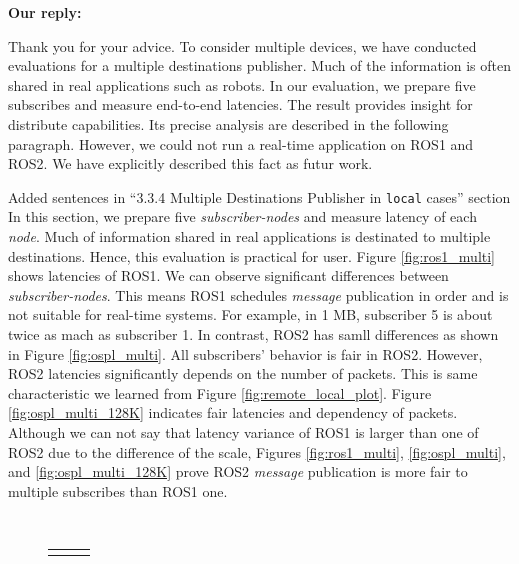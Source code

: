 \documentclass{article}
\begin{document}
\begin{enumerate}
  \begin{flushleft}
    \textbf{Our reply:}
  \end{flushleft}
  Thank you for your advice.
  To consider multiple devices, we have conducted evaluations for a multiple destinations publisher.
  Much of the information is often shared in real applications such as robots.
  In our evaluation, we prepare five subscribes and measure end-to-end latencies.
  The result provides insight for distribute capabilities.
  Its precise analysis are described in the following paragraph.
  However, we could not run a real-time application on ROS1 and ROS2.
  We have explicitly described this fact as futur work.
  \begin{itembox}[|]{Added sentences in ``3.3.4 Multiple Destinations Publisher in \texttt{local} cases'' section}
    In this section, we prepare five \emph{subscriber-nodes} and measure latency of each \emph{node}.
    Much of information shared in real applications is destinated to multiple destinations.
    Hence, this evaluation is practical for user.
    Figure \ref{fig:ros1_multi} shows latencies of ROS1.
    We can observe significant differences between \emph{subscriber-nodes}.
    This means ROS1 schedules \emph{message} publication in order and is not suitable for real-time systems.
    For example, in 1 MB, subscriber 5 is about twice as mach as subscriber 1.
    In contrast, ROS2 has samll differences as shown in Figure \ref{fig:ospl_multi}.
    All subscribers' behavior is fair in ROS2.
    However, ROS2 latencies significantly depends on the number of packets.
    This is same characteristic we learned from Figure \ref{fig:remote_local_plot}.
    Figure \ref{fig:ospl_multi_128K} indicates fair latencies and dependency of packets.
    Although we can not say that latency variance of ROS1 is larger than one of ROS2 due to the difference of the scale, Figures \ref{fig:ros1_multi}, \ref{fig:ospl_multi}, and \ref{fig:ospl_multi_128K} prove ROS2 \emph{message} publication is more fair to multiple subscribes than ROS1 one.
  \end{itembox}\\
  \setcounter{figure}{15}
  \begin{figure}[h]
    \begin{tabular}{ccc}
      \begin{minipage}[t]{0.31\textwidth}

\end{minipage}
\end{tabular}
\end{figure}
\end{enumerate}
\end{document}
